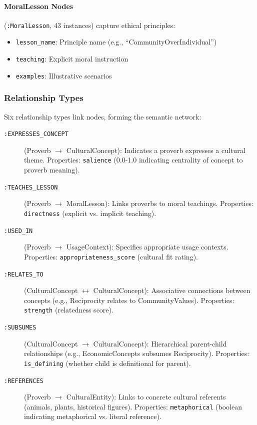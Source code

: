 \paragraph{MoralLesson Nodes} (\texttt{:MoralLesson}, 43 instances) capture ethical principles:
\begin{itemize}
    \item \texttt{lesson\_name}: Principle name (e.g., ``CommunityOverIndividual'')
    \item \texttt{teaching}: Explicit moral instruction
    \item \texttt{examples}: Illustrative scenarios
\end{itemize}

\subsubsection{Relationship Types}
\label{subsubsec:relationship_types}

Six relationship types link nodes, forming the semantic network:

\begin{description}
    \item[\texttt{:EXPRESSES\_CONCEPT}] (Proverb $\rightarrow$ CulturalConcept): Indicates a proverb expresses a cultural theme. Properties: \texttt{salience} (0.0-1.0 indicating centrality of concept to proverb meaning).
    
    \item[\texttt{:TEACHES\_LESSON}] (Proverb $\rightarrow$ MoralLesson): Links proverbs to moral teachings. Properties: \texttt{directness} (explicit vs. implicit teaching).
    
    \item[\texttt{:USED\_IN}] (Proverb $\rightarrow$ UsageContext): Specifies appropriate usage contexts. Properties: \texttt{appropriateness\_score} (cultural fit rating).
    
    \item[\texttt{:RELATES\_TO}] (CulturalConcept $\leftrightarrow$ CulturalConcept): Associative connections between concepts (e.g., Reciprocity relates to CommunityValues). Properties: \texttt{strength} (relatedness score).
    
    \item[\texttt{:SUBSUMES}] (CulturalConcept $\rightarrow$ CulturalConcept): Hierarchical parent-child relationships (e.g., EconomicConcepts subsumes Reciprocity). Properties: \texttt{is\_defining} (whether child is definitional for parent).
    
    \item[\texttt{:REFERENCES}] (Proverb $\rightarrow$ CulturalEntity): Links to concrete cultural referents (animals, plants, historical figures). Properties: \texttt{metaphorical} (boolean indicating metaphorical vs. literal reference).
\end{description}

